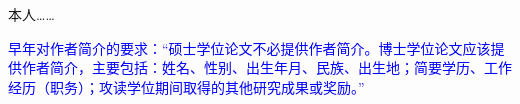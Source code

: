 
\begin{resume}

本人……


\textcolor{blue}{
  早年对作者简介的要求：“硕士学位论文不必提供作者简介。博士学位论文应该提供作者简介，主要包括：姓名、性别、出生年月、民族、出生地；简要学历、工作经历（职务）；攻读学位期间取得的其他研究成果或奖励。”
}

\end{resume}

